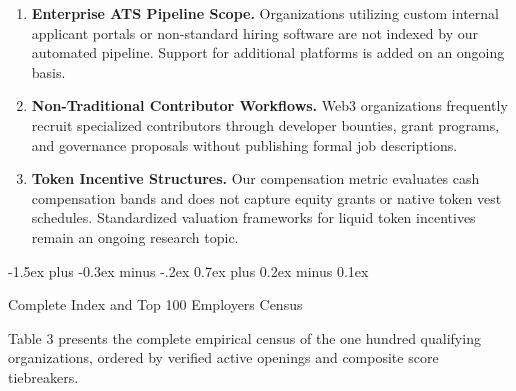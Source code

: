 \documentclass{article}
\makeatletter
\renewcommand\section{\@startsection {section}{1}{\z@}%
  {-1.5ex plus -0.3ex minus -.2ex}%
  {0.7ex plus 0.2ex minus 0.1ex}%
  {\large\bfseries\raggedright}}
\makeatother
\begin{document}
\begin{enumerate}
\item \textbf{Enterprise ATS Pipeline Scope.} Organizations utilizing custom internal applicant portals or non-standard hiring software are not indexed by our automated pipeline. Support for additional platforms is added on an ongoing basis.
\item \textbf{Non-Traditional Contributor Workflows.} Web3 organizations frequently recruit specialized contributors through developer bounties, grant programs, and governance proposals without publishing formal job descriptions.
\item \textbf{Token Incentive Structures.} Our compensation metric evaluates cash compensation bands and does not capture equity grants or native token vest schedules. Standardized valuation frameworks for liquid token incentives remain an ongoing research topic.
\end{enumerate}

\section{Complete Index and Top 100 Employers Census}

Table 3 presents the complete empirical census of the one hundred qualifying organizations, ordered by verified active openings and composite score tiebreakers.
\end{document}
